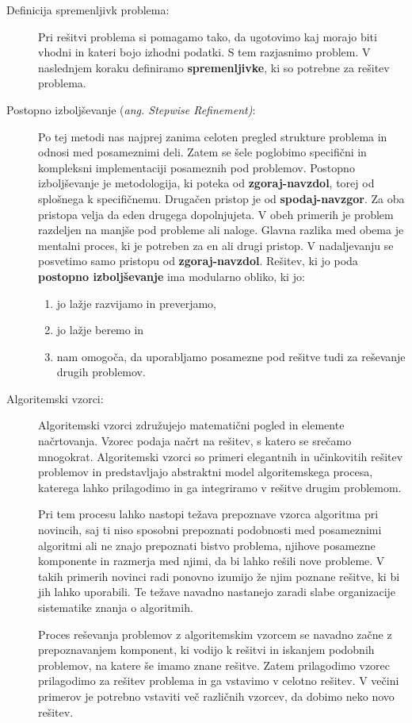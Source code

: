 \begin{description}
\item [Definicija spremenljivk problema:] Pri rešitvi problema
  si pomagamo tako, da ugotovimo kaj morajo biti vhodni in kateri bojo
  izhodni podatki. S tem razjasnimo problem. V naslednjem koraku
  definiramo \textbf{spremenljivke}, ki so potrebne za rešitev
  problema.
\item [Postopno izboljševanje (\emph{ang. Stepwise
      Refinement)}:]Po tej metodi nas najprej zanima celoten pregled
  strukture problema in odnosi med posameznimi deli. Zatem se šele
  poglobimo specifični in kompleksni implementaciji posameznih pod
  problemov. Postopno izboljševanje je metodologija, ki poteka od
  \textbf{zgoraj-navzdol}, torej od splošnega k specifičnemu. Drugačen
  pristop je od \textbf{spodaj-navzgor}. Za oba pristopa velja da eden
  drugega dopolnjujeta. V obeh primerih je problem razdeljen na manjše
  pod probleme ali naloge. Glavna razlika med obema je mentalni
  proces, ki je potreben za en ali drugi pristop.  V nadaljevanju se
  posvetimo samo pristopu od \textbf{zgoraj-navzdol}. Rešitev, ki jo
  poda \textbf{postopno izboljševanje} ima modularno obliko, ki jo:
  \begin{enumerate}
    \tightlist
  \item jo lažje razvijamo in preverjamo,
  \item jo lažje beremo in
  \item nam omogoča, da uporabljamo posamezne pod rešitve tudi za
    reševanje drugih problemov.
  \end{enumerate}
\item [Algoritemski vzorci:] Algoritemski vzorci združujejo
  matematični pogled in elemente načrtovanja. Vzorec podaja načrt na
  rešitev, s katero se srečamo mnogokrat. Algoritemski vzorci so
  primeri elegantnih in učinkovitih rešitev problemov in predstavljajo
  abstraktni model algoritemskega procesa, katerega lahko prilagodimo
  in ga integriramo v rešitve drugim problemom.

  Pri tem procesu lahko nastopi težava prepoznave vzorca algoritma pri
  novincih, saj ti niso sposobni prepoznati podobnosti med posameznimi
  algoritmi ali ne znajo prepoznati bistvo problema, njihove posamezne
  komponente in razmerja med njimi, da bi lahko rešili nove
  probleme. V takih primerih novinci radi ponovno izumijo že njim
  poznane rešitve, ki bi jih lahko uporabili. Te težave navadno
  nastanejo zaradi slabe organizacije sistematike znanja o algoritmih.

  Proces reševanja problemov z algoritemskim vzorcem se navadno začne
  z prepoznavanjem komponent, ki vodijo k rešitvi in iskanjem podobnih
  problemov, na katere še imamo znane rešitve. Zatem prilagodimo
  vzorec prilagodimo za rešitev problema in ga vstavimo v celotno
  rešitev. V večini primerov je potrebno vstaviti več različnih
  vzorcev, da dobimo neko novo rešitev.
\end{description}


